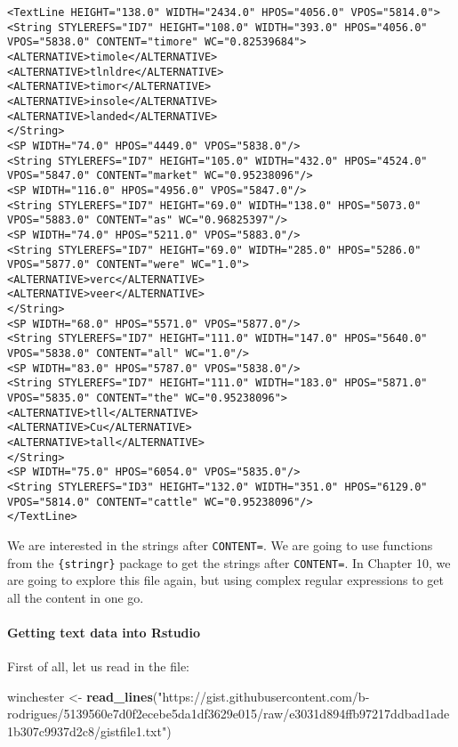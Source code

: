 \documentclass[
]{article}
\newenvironment{Shaded}{\begin{snugshade}}{\end{snugshade}}
\newcommand{\KeywordTok}[1]{\textcolor[rgb]{0.13,0.29,0.53}{\textbf{#1}}}
\newcommand{\NormalTok}[1]{#1}
\newcommand{\StringTok}[1]{\textcolor[rgb]{0.31,0.60,0.02}{#1}}
\begin{document}
\begin{verbatim}
<TextLine HEIGHT="138.0" WIDTH="2434.0" HPOS="4056.0" VPOS="5814.0">
<String STYLEREFS="ID7" HEIGHT="108.0" WIDTH="393.0" HPOS="4056.0" VPOS="5838.0" CONTENT="timore" WC="0.82539684">
<ALTERNATIVE>timole</ALTERNATIVE>
<ALTERNATIVE>tlnldre</ALTERNATIVE>
<ALTERNATIVE>timor</ALTERNATIVE>
<ALTERNATIVE>insole</ALTERNATIVE>
<ALTERNATIVE>landed</ALTERNATIVE>
</String>
<SP WIDTH="74.0" HPOS="4449.0" VPOS="5838.0"/>
<String STYLEREFS="ID7" HEIGHT="105.0" WIDTH="432.0" HPOS="4524.0" VPOS="5847.0" CONTENT="market" WC="0.95238096"/>
<SP WIDTH="116.0" HPOS="4956.0" VPOS="5847.0"/>
<String STYLEREFS="ID7" HEIGHT="69.0" WIDTH="138.0" HPOS="5073.0" VPOS="5883.0" CONTENT="as" WC="0.96825397"/>
<SP WIDTH="74.0" HPOS="5211.0" VPOS="5883.0"/>
<String STYLEREFS="ID7" HEIGHT="69.0" WIDTH="285.0" HPOS="5286.0" VPOS="5877.0" CONTENT="were" WC="1.0">
<ALTERNATIVE>verc</ALTERNATIVE>
<ALTERNATIVE>veer</ALTERNATIVE>
</String>
<SP WIDTH="68.0" HPOS="5571.0" VPOS="5877.0"/>
<String STYLEREFS="ID7" HEIGHT="111.0" WIDTH="147.0" HPOS="5640.0" VPOS="5838.0" CONTENT="all" WC="1.0"/>
<SP WIDTH="83.0" HPOS="5787.0" VPOS="5838.0"/>
<String STYLEREFS="ID7" HEIGHT="111.0" WIDTH="183.0" HPOS="5871.0" VPOS="5835.0" CONTENT="the" WC="0.95238096">
<ALTERNATIVE>tll</ALTERNATIVE>
<ALTERNATIVE>Cu</ALTERNATIVE>
<ALTERNATIVE>tall</ALTERNATIVE>
</String>
<SP WIDTH="75.0" HPOS="6054.0" VPOS="5835.0"/>
<String STYLEREFS="ID3" HEIGHT="132.0" WIDTH="351.0" HPOS="6129.0" VPOS="5814.0" CONTENT="cattle" WC="0.95238096"/>
</TextLine>
\end{verbatim}

We are interested in the strings after \texttt{CONTENT=}. We are going to use functions from the \texttt{\{stringr\}}
package to get the strings after \texttt{CONTENT=}. In Chapter 10, we are going to explore this file
again, but using complex regular expressions to get all the content in one go.

\hypertarget{getting-text-data-into-rstudio}{%
\paragraph{Getting text data into Rstudio}\label{getting-text-data-into-rstudio}}

First of all, let us read in the file:

\begin{Shaded}
\begin{Highlighting}[]
\NormalTok{winchester \textless{}{-}}\StringTok{ }\KeywordTok{read\_lines}\NormalTok{(}\StringTok{"https://gist.githubusercontent.com/b{-}rodrigues/5139560e7d0f2ecebe5da1df3629e015/raw/e3031d894ffb97217ddbad1ade1b307c9937d2c8/gistfile1.txt"}\NormalTok{)}
\end{Highlighting}
\end{Shaded}
\end{document}
